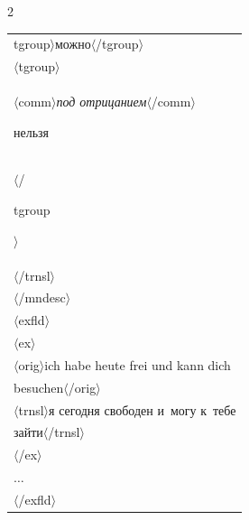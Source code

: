 \begin{multicols}{2}
{\begin{tabular}{l}
{tgroup}$\rangle$можно$\langle$/{\sf tgroup}$\rangle$\\


  \hspace*{10mm}$\langle${\sf tgroup}$\rangle$\\


  \hspace*{12mm}$\langle${\sf comm}$\rangle$\textit{под отрицанием}$\langle$/{\sf comm}$\rangle$ 


нельзя\\


  \hspace*{10mm}$\langle$/{\sf 


tgroup}$\rangle$\\


  \hspace*{8mm}$\langle$/{\sf trnsl}$\rangle$\\


  \hspace*{6mm}$\langle$/{\sf mndesc}$\rangle$\\


  \hspace*{6mm}$\langle${\sf exfld}$\rangle$\\


  \hspace*{8mm}$\langle${\sf ex}$\rangle$\\


  \hspace*{12mm}$\langle${\sf orig}$\rangle$ich habe heute frei und kann dich\\


  \hspace*{12mm}besuchen$\langle$/{\sf orig}$\rangle$\\


  \hspace*{12mm}$\langle${\sf  trnsl}$\rangle$я сегодня свободен и~могу к~тебе\\


  \hspace*{12mm}зайти$\langle$/{\sf trnsl}$\rangle$\\


  \hspace*{8mm}$\langle$/{\sf ex}$\rangle$\\


  \hspace*{8mm}$\ldots$\\


  \hspace*{6mm}$\langle$/{\sf exfld}$\rangle$\\



\end{tabular}}
\end{multicols}
